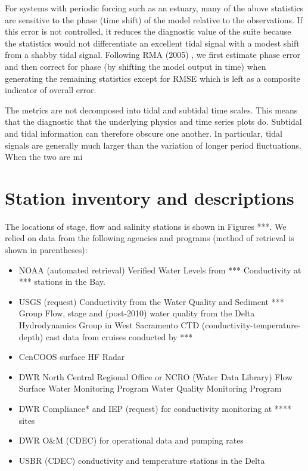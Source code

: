 For systems with periodic forcing such as an estuary, many of the above statistics are sensitive to the phase 
(time shift) of the model relative to the observations. If this error is not controlled, 
it reduces the diagnostic value of the suite because the statistics would not differentiate an excellent
tidal signal with a modest shift from a shabby tidal signal. 
Following  RMA (2005) \cite{RMA05}, we first estimate phase error and then correct for phase (by shifting the model output in time) 
when generating the remaining statistics except for RMSE which is left as a composite indicator of overall error.

The metrics are not decomposed into tidal and subtidal time scales. This means that the diagnostic 
that the underlying physics and time series plots do. Subtidal and tidal information can therefore
obscure one another. In particular, tidal signals are generally much larger than the variation
of longer period fluctuations. When the two are mi

\section{Station inventory and descriptions}
The locations of stage, flow and salinity stations is shown in Figures ***. 
We relied on data from the following agencies and programs (method of retrieval is shown in parentheses):

\begin{itemize}
  \itemsep1pt \parskip0pt 
	\item NOAA (automated retrieval)
	    \subitem Verified Water Levels from ***
			\subitem Conductivity at *** stations in the Bay.
	\item USGS (request)
	    \subitem Conductivity from the Water Quality and Sediment *** Group
			\subitem Flow, stage and (post-2010) water quality from the Delta Hydrodynamics Group in West Sacramento
			\subitem CTD (conductivity-temperature-depth) cast data from cruises conducted by ***
  \item CenCOOS surface HF Radar
	\item DWR North Central Regional Office or NCRO (Water Data Library) 
	    \subitem Flow
			\subitem Surface Water Monitoring Program
			\subitem Water Quality Monitoring Program
	\item DWR Compliance* and IEP (request) for conductivity monitoring at **** sites
	\item DWR O\&M (CDEC) for operational data and pumping rates
	\item USBR (CDEC) conductivity and temperature stations in the Delta
\end{itemize}

